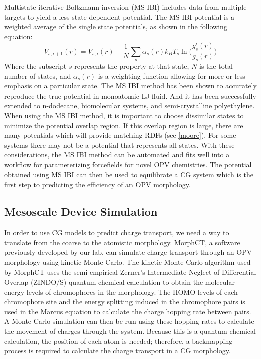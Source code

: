 Multistate iterative Boltzmann inversion (MS IBI) includes data from multiple targets to yield a less state dependent potential\cite{Moore2014}.
The MS IBI potential is a weighted average of the single state potentials, as shown in the following equation:
\[
    V_{s,i+1}(r) = V_{s,i}(r) - \frac{1}{N}\sum_{s}\alpha_{s}(r)k_{B}T_{s} \ln\bigg(\frac{g_{s}^{i}(r)}{g_{s}(r)}\bigg)
\]
Where the subscript $s$ represents the property at that state, $N$ is the total number of states, and $\alpha_{s}(r)$ is a weighting function allowing for more or less emphasis on a particular state.
The MS IBI method has been shown to accurately reproduce the true potential in monoatomic LJ fluid\cite{Moore2014}.
And it has been successfully extended to n-dodecane\cite{Moore2014}, biomolecular systems\cite{Moore2016}, and semi-crystalline polyethylene\cite{Agrawal2016}.
When using the MS IBI method, it is important to choose dissimilar states to minimize the potential overlap region.
If this overlap region is large, there are many potentials which will provide matching RDFs (see \autoref{moore}).
For some systems there may not be a potential that represents all states.
With these considerations, the MS IBI method can be automated and fits well into a workflow for parameterizing forcefields for novel OPV chemistries.
The potential obtained using MS IBI can then be used to equilibrate a CG system which is the first step to predicting the efficiency of an OPV morphology.

\subsection*{Mesoscale Device Simulation}

In order to use CG models to predict charge transport, we need a way to translate from the coarse to the atomistic morphology.
MorphCT, a software previously developed by our lab, can simulate charge transport through an OPV morphology using kinetic Monte Carlo\cite{Miller2018a,MorphCT,morphct2.2}.
The kinetic Monte Carlo algorithm used by MorphCT uses the semi-empirical Zerner's Intermediate Neglect of Differential Overlap (ZINDO/S) quantum chemical calculation to obtain the molecular energy levels of chromophores in the morphology.
The HOMO levels of each chromophore site and the energy splitting induced in the chromophore pairs is used in the Marcus equation to calculate the charge hopping rate between pairs.
A Monte Carlo simulation can then be run using these hopping rates to calculate the movement of charges through the system.
Because this is a quantum chemical calculation, the position of each atom is needed; therefore, a backmapping process is required to calculate the charge transport in a CG morphology.

